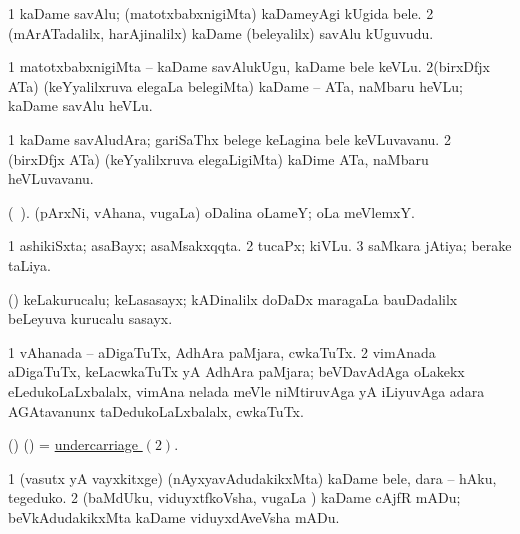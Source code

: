 \bentry
{} 
\gl{\nA}
\expl{}
\bmng
\bnum
\num{1} kaDame savAlu; (matotxbabxnigiMta) kaDameyAgi kUgida bele. 
\num{2} (mArATadalilx, harAjinalilx) kaDame (beleyalilx) savAlu kUguvudu. 
\enum
\emng
\eentry

\bentry
{} 
\gl{\sakirx}
\bmng
\bnum
\num{1} matotxbabxnigiMta -- kaDame savAlukUgu, kaDame bele keVLu. 
\num{2}(birxDfjx ATa) (keYyalilxruva elegaLa belegiMta) kaDame -- ATa, naMbaru heVLu; kaDame savAlu heVLu. 
\enum
\emng
\eentry

\bentry
{} 
\gl{\nA}
\expl{}
\bmng
\bnum
\num{1} kaDame savAludAra; gariSaThx belege keLagina bele keVLuvavanu. 
\num{2} (birxDfjx ATa) (keYyalilxruva elegaLigiMta) kaDime ATa, naMbaru heVLuvavanu. 
\enum
\emng
\eentry

\bentry
{} 
\gl{\nA}
\expl{}
\bmng
 (\bava\ ). (pArxNi, vAhana, \mo vugaLa) oDalina oLameY; oLa meVlemxY. 
\emng
\eentry

\bentry
{} 
\gl{\gu}
\expl{}
\bmng
\bnum
\num{1} ashikiSxta; asaBayx; asaMsakxqqta. 
\num{2} tucaPx; kiVLu. 
\num{3} saMkara jAtiya; berake taLiya. 
\enum
\emng
\eentry

\bentry
{} 
\gl{\nA}
\expl{}
\bmng
 (\ame) keLakurucalu; keLasasayx; kADinalilx doDaDx maragaLa bauDadalilx beLeyuva kurucalu sasayx. 
\emng
\eentry

\bentry
{} 
\gl{\nA}
\expl{}
\bmng
\bnum
\num{1} vAhanada -- aDigaTuTx, AdhAra paMjara, cwkaTuTx. 
\hypertarget{undercarriage(2)}{} 
\num{2} vimAnada aDigaTuTx, keLacwkaTuTx yA AdhAra paMjara; beVDavAdAga oLakekx eLedukoLaLxbalalx, vimAna nelada meVle niMtiruvAga yA iLiyuvAga adara AGAtavanunx taDedukoLaLxbalalx, cwkaTuTx. 
\enum
\emng
\eentry

\bentry
{} 
\gl{\nA}
\expl{}
\bmng
 (\birx) (\AmA) = \hyperlink{undercarriage(2)}{undercarriage \((2)\)}. 
\emng
\eentry

\bentry
{} 
\gl{\sakirx}
\expl{}
\bmng
\bnum
\num{1} (vasutx yA vayxkitxge) (nAyxyavAdudakikxMta) kaDame bele, dara -- hAku, tegeduko. 
\num{2} (baMdUku, viduyxtfkoVsha, \mo vugaLa \vi) kaDame cAjfR mADu; beVkAdudakikxMta kaDame viduyxdAveVsha mADu. 
\enum
\emng
\eentry

